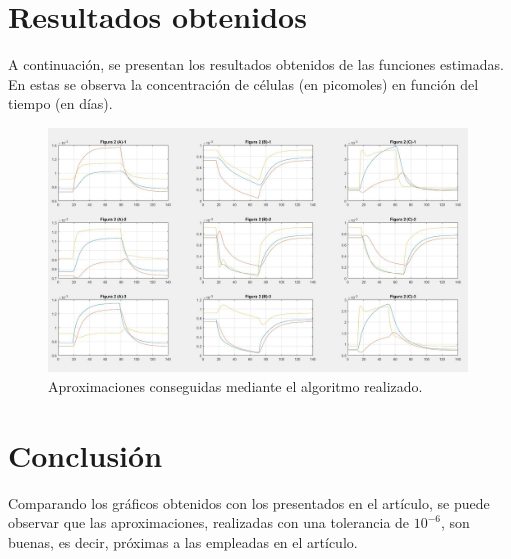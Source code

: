 \documentclass[a4paper]{article}
\begin{document}
\section{Resultados obtenidos}
A continuación, se presentan los resultados obtenidos de las funciones estimadas. En estas se observa la concentración de células (en picomoles) en función del tiempo (en días). 

\begin{figure}[H]
	\centering
	\includegraphics[width=0.99\textwidth]{GraficosLindos.JPG}
	\caption{Aproximaciones conseguidas mediante el algoritmo realizado.}
\end{figure}	


\section{Conclusión}
Comparando los gráficos obtenidos con los presentados en el artículo, se puede observar que las aproximaciones, realizadas con una tolerancia de $10^{-6}$, son buenas, es decir, próximas a las empleadas en el artículo. 	
 
\end{document}
